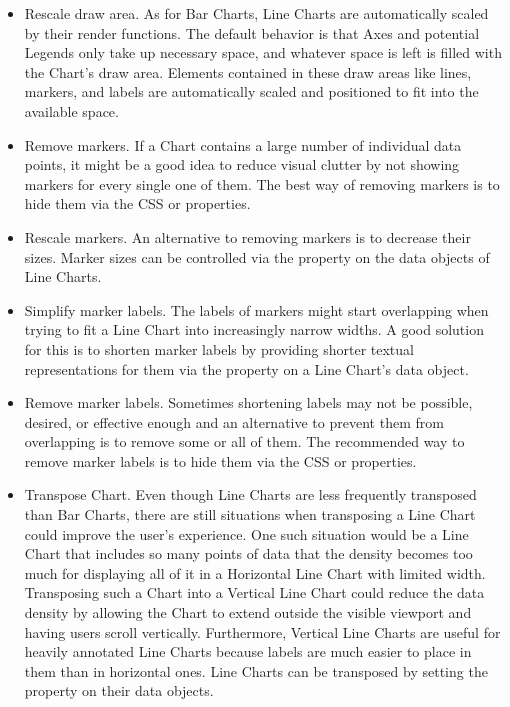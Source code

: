 \begin{itemize}

\item
Rescale draw area.
As for Bar Charts, Line Charts are automatically scaled by their render functions.
The default behavior is that Axes and potential Legends only take up necessary space, and whatever space is left is filled with the Chart's draw area.
Elements contained in these draw areas like lines, markers, and labels are automatically scaled and positioned to fit into the available space.

\item
Remove markers.
If a Chart contains a large number of individual data points, it might be a good idea to reduce visual clutter by not showing markers for every single one of them.
The best way of removing markers is to hide them via the CSS  or  properties.

\item
Rescale markers.
An alternative to removing markers is to decrease their sizes.
Marker sizes can be controlled via the  property on the data objects of Line Charts.

\item
Simplify marker labels.
The labels of markers might start overlapping when trying to fit a Line Chart into increasingly narrow widths.
A good solution for this is to shorten marker labels by providing shorter textual representations for them via the  property on a Line Chart's data object.

\item
Remove marker labels.
Sometimes shortening labels may not be possible, desired, or effective enough and an alternative to prevent them from overlapping is to remove some or all of them.
The recommended way to remove marker labels is to hide them via the CSS  or  properties.

\item
Transpose Chart.
Even though Line Charts are less frequently transposed than Bar Charts, there are still situations when transposing a Line Chart could improve the user's experience.
One such situation would be a Line Chart that includes so many points of data that the density becomes too much for displaying all of it in a Horizontal Line Chart with limited width.
Transposing such a Chart into a Vertical Line Chart could reduce the data density by allowing the Chart to extend outside the visible viewport and having users scroll vertically.
Furthermore, Vertical Line Charts are useful for heavily annotated Line Charts because labels are much easier to place in them than in horizontal ones.
Line Charts can be transposed by setting the  property on their data objects.


\end{itemize}
